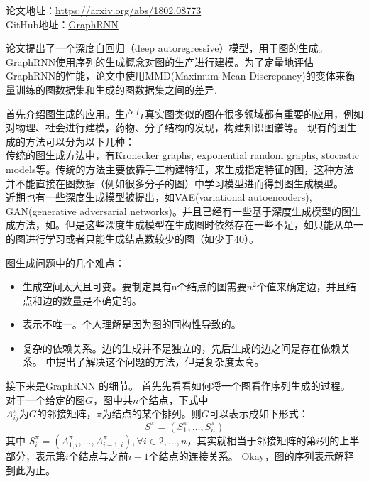 
论文地址：\href{https://arxiv.org/abs/1802.08773}{https://arxiv.org/abs/1802.08773}\\
GitHub地址：\href{https://github.com/snap-stanford/GraphRNN}{GraphRNN}

论文提出了一个深度自回归（deep autoregressive）模型，用于图的生成。GraphRNN使用序列的生成概念对图的生产进行建模。为了定量地评估GraphRNN的性能，论文中使用MMD(Maximum Mean Discrepancy)的变体来衡量训练的图数据集和生成的图数据集之间的差异. 
\par 首先介绍图生成的应用。生产与真实图类似的图在很多领域都有重要的应用，例如对物理、社会进行建模，药物、分子结构的发现，构建知识图谱等。
现有的图生成的方法可以分为以下几种：\\
传统的图生成方法中，有Kronecker graphs, exponential random graphs, stocastic models等。传统的方法主要依靠手工构建特征，来生成指定特征的图，这种方法并不能直接在图数据（例如很多分子的图）中学习模型进而得到图生成模型。\\
近期也有一些深度生成模型被提出，如VAE(variational autoencoders), GAN(generative adversarial networks)\cite{kingma2014auto,goodfellow2014generative}。并且已经有一些基于深度生成模型的图生成方法，如\cite{simonovsky2018graphvae,li2018learning}。但是这些深度生成模型在生成图时依然存在一些不足，如只能从单一的图进行学习或者只能生成结点数较少的图（如少于40）。
\par 图生成问题中的几个难点：
\begin{itemize}
    \item 生成空间太大且可变。要制定具有n个结点的图需要$n^2$个值来确定边，并且结点和边的数量是不确定的。
    \item 表示不唯一。个人理解是因为图的同构性导致的。
    \item 复杂的依赖关系。边的生成并不是独立的，先后生成的边之间是存在依赖关系。\cite{li2018learning} 中提出了解决这个问题的方法，但是复杂度太高。
\end{itemize}

\par 接下来是GraphRNN 的细节。
首先先看看如何将一个图看作序列生成的过程。
对于一个给定的图$G$，图中共$n$个结点，下式中 $A^{\pi}_{ij} 为G的邻接矩阵，\pi 为结点的某个排列$。则$G$可以表示成如下形式： 
$$
S^\pi = (S^{\pi}_1,...,S^{\pi}_n)
$$
其中 $S^{\pi}_i = (A^{\pi}_{1,i},..., A^{\pi}_{i-1,i}), \forall i \in {2,...,n} $，其实就相当于邻接矩阵的第$i$列的上半部分，表示第$i$个结点与之前$i-1$个结点的连接关系。
Okay，图的序列表示解释到此为止。


